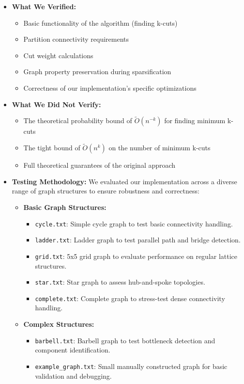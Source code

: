 \documentclass[11pt]{article}
\begin{document}
\begin{itemize}
    \item \textbf{What We Verified:}
    \begin{itemize}
        \item Basic functionality of the algorithm (finding k-cuts)
        \item Partition connectivity requirements
        \item Cut weight calculations
        \item Graph property preservation during sparsification
        \item Correctness of our implementation's specific optimizations
    \end{itemize}

    \item \textbf{What We Did Not Verify:}
    \begin{itemize}
        \item The theoretical probability bound of \( \tilde{O}(n^{-k}) \) for finding minimum k-cuts
        \item The tight bound of \( \tilde{O}(n^k) \) on the number of minimum k-cuts
        \item Full theoretical guarantees of the original approach
    \end{itemize}

    \item \textbf{Testing Methodology:}
We evaluated our implementation across a diverse range of graph structures to ensure robustness and correctness:

\begin{itemize}
    \item \textbf{Basic Graph Structures:}
    \begin{itemize}
        \item \texttt{cycle.txt}: Simple cycle graph to test basic connectivity handling.
        \item \texttt{ladder.txt}: Ladder graph to test parallel path and bridge detection.
        \item \texttt{grid.txt}: 5x5 grid graph to evaluate performance on regular lattice structures.
        \item \texttt{star.txt}: Star graph to assess hub-and-spoke topologies.
        \item \texttt{complete.txt}: Complete graph to stress-test dense connectivity handling.
    \end{itemize}
    
    \item \textbf{Complex Structures:}
    \begin{itemize}
        \item \texttt{barbell.txt}: Barbell graph to test bottleneck detection and component identification.
        \item \texttt{example\_graph.txt}: Small manually constructed graph for basic validation and debugging.
    \end{itemize}
    

\end{itemize}
\end{itemize}
\end{document}

